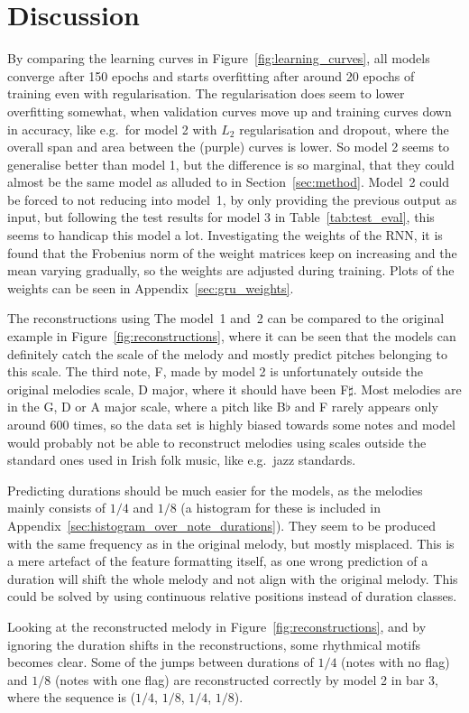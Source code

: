 \section{Discussion}
\label{sec:discussion}

By comparing the learning curves in Figure~\ref{fig:learning_curves}, all models converge after 150 epochs and starts overfitting after around 20 epochs of training even with regularisation. The regularisation does seem to lower overfitting somewhat, when validation curves move up and training curves down in accuracy, like e.g.\ for model 2 with $L_2$ regularisation and dropout, where the overall span and area between the (purple) curves is lower. So model 2 seems to generalise better than model 1, but the difference is so marginal, that they could almost be the same model as alluded to in Section~\ref{sec:method}.
Model~2 could be forced to not reducing into model~1, by only providing the previous output as input, but following the test results for model 3 in Table~\ref{tab:test_eval}, this seems to handicap this model a lot.
Investigating the weights of the RNN, it is found that the Frobenius norm of the weight matrices keep on increasing and the mean varying gradually, so the weights are adjusted during training.
Plots of the weights can be seen in Appendix~\ref{sec:gru_weights}.

The reconstructions using The model~1 and~2 can be compared to the original example in Figure~\ref{fig:reconstructions}, where it can be seen that the models can definitely catch the scale of the melody and mostly predict pitches belonging to this scale.
The third note, F, made by model 2 is unfortunately outside the original melodies scale, D major, where it should have been F$\sharp$. Most melodies are in the G, D or A major scale, where a pitch like B$\flat$ and F rarely appears only around 600 times, so the data set is highly biased towards some notes and model would probably not be able to reconstruct melodies using scales outside the standard ones used in Irish folk music, like e.g.\ jazz standards.   

Predicting durations should be much easier for the models, as the melodies mainly consists of $1/4$ and $1/8$ (a histogram for these is included in Appendix~\ref{sec:histogram_over_note_durations}).
They seem to be produced with the same frequency as in the original melody, but mostly misplaced. This is a mere artefact of the feature formatting itself, as one wrong prediction of a duration will shift the whole melody and not align with the original melody. This could be solved by using continuous relative positions instead of duration classes. 

Looking at the reconstructed melody in Figure~\ref{fig:reconstructions}, and
by ignoring the duration shifts in the reconstructions, some rhythmical motifs becomes clear. Some of the jumps between durations of $1/4$ (notes with no flag) and $1/8$ (notes with one flag) are reconstructed correctly by model 2 in bar 3, where the sequence is ($1/4$, $1/8$, $1/4$, $1/8$). 
